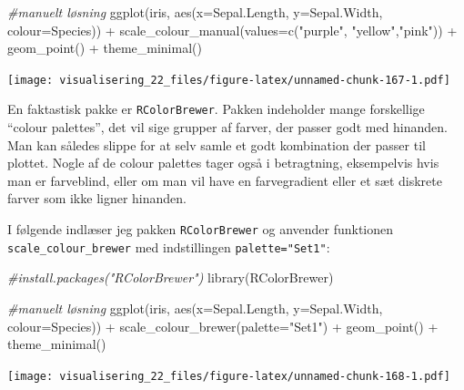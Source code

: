 \documentclass[
]{book}
\newenvironment{Shaded}{\begin{snugshade}}{\end{snugshade}}
\newcommand{\AttributeTok}[1]{\textcolor[rgb]{0.77,0.63,0.00}{#1}}
\newcommand{\CommentTok}[1]{\textcolor[rgb]{0.56,0.35,0.01}{\textit{#1}}}
\newcommand{\FunctionTok}[1]{\textcolor[rgb]{0.00,0.00,0.00}{#1}}
\newcommand{\NormalTok}[1]{#1}
\newcommand{\SpecialCharTok}[1]{\textcolor[rgb]{0.00,0.00,0.00}{#1}}
\newcommand{\StringTok}[1]{\textcolor[rgb]{0.31,0.60,0.02}{#1}}
\begin{document}
\begin{Shaded}
\begin{Highlighting}[]
\CommentTok{\#manuelt løsning}
\FunctionTok{ggplot}\NormalTok{(iris, }\FunctionTok{aes}\NormalTok{(}\AttributeTok{x=}\NormalTok{Sepal.Length, }\AttributeTok{y=}\NormalTok{Sepal.Width, }\AttributeTok{colour=}\NormalTok{Species)) }\SpecialCharTok{+}
  \FunctionTok{scale\_colour\_manual}\NormalTok{(}\AttributeTok{values=}\FunctionTok{c}\NormalTok{(}\StringTok{"purple"}\NormalTok{, }\StringTok{"yellow"}\NormalTok{,}\StringTok{"pink"}\NormalTok{)) }\SpecialCharTok{+}
  \FunctionTok{geom\_point}\NormalTok{() }\SpecialCharTok{+}
  \FunctionTok{theme\_minimal}\NormalTok{() }
\end{Highlighting}
\end{Shaded}

\texttt{[image: visualisering\_22\_files/figure-latex/unnamed-chunk-167-1.pdf]}

En faktastisk pakke er \texttt{RColorBrewer}. Pakken indeholder mange forskellige ``colour palettes'', det vil sige grupper af farver, der passer godt med hinanden. Man kan således slippe for at selv samle et godt kombination der passer til plottet. Nogle af de colour palettes tager også i betragtning, eksempelvis hvis man er farveblind, eller om man vil have en farvegradient eller et sæt diskrete farver som ikke ligner hinanden.

I følgende indlæser jeg pakken \texttt{RColorBrewer} og anvender funktionen \texttt{scale\_colour\_brewer} med indstillingen \texttt{palette="Set1"}:

\begin{Shaded}
\begin{Highlighting}[]
\CommentTok{\#install.packages("RColorBrewer")}
\FunctionTok{library}\NormalTok{(RColorBrewer)}

\CommentTok{\#manuelt løsning}
\FunctionTok{ggplot}\NormalTok{(iris, }\FunctionTok{aes}\NormalTok{(}\AttributeTok{x=}\NormalTok{Sepal.Length, }\AttributeTok{y=}\NormalTok{Sepal.Width, }\AttributeTok{colour=}\NormalTok{Species)) }\SpecialCharTok{+}
  \FunctionTok{scale\_colour\_brewer}\NormalTok{(}\AttributeTok{palette=}\StringTok{"Set1"}\NormalTok{) }\SpecialCharTok{+}
  \FunctionTok{geom\_point}\NormalTok{() }\SpecialCharTok{+}
  \FunctionTok{theme\_minimal}\NormalTok{() }
\end{Highlighting}
\end{Shaded}

\texttt{[image: visualisering\_22\_files/figure-latex/unnamed-chunk-168-1.pdf]}
\end{document}
